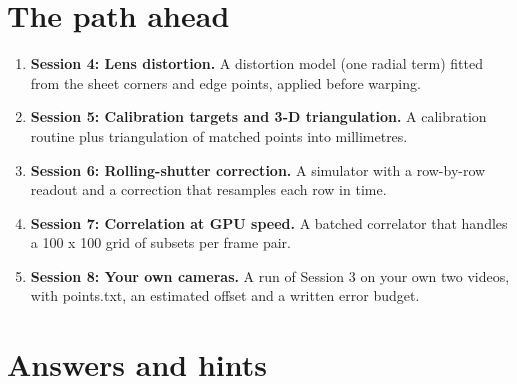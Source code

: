 \documentclass[11pt,a4paper]{article}
\begin{document}
\section{The path ahead}
\begin{enumerate}[nosep]
\item \textbf{Session 4: Lens distortion.} A distortion model (one radial term) fitted from the sheet corners and edge points, applied before warping.
\item \textbf{Session 5: Calibration targets and 3-D triangulation.} A calibration routine plus triangulation of matched points into millimetres.
\item \textbf{Session 6: Rolling-shutter correction.} A simulator with a row-by-row readout and a correction that resamples each row in time.
\item \textbf{Session 7: Correlation at GPU speed.} A batched correlator that handles a 100 x 100 grid of subsets per frame pair.
\item \textbf{Session 8: Your own cameras.} A run of Session 3 on your own two videos, with points.txt, an estimated offset and a written error budget.
\end{enumerate}

\section{Answers and hints}
\end{document}
